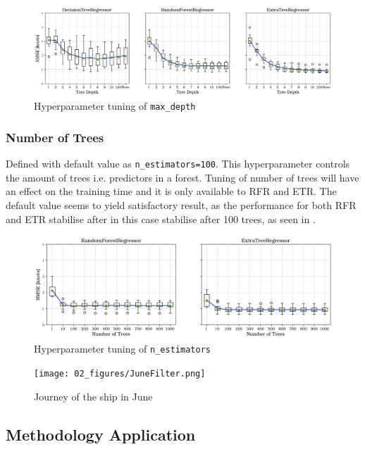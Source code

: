 \begin{figure}[h]
    \centering
        \includegraphics[width=.95\textwidth]{02_figures/hpo_max_depth.png}
        \caption{Hyperparameter tuning of {\tt max\_depth}}
        \label{fig:hpo_max_depth}
\end{figure}

\subsubsection*{Number of Trees}\label{sec:n_estimators}

Defined with default value as {\tt n\_estimators=100}. This hyperparameter controls the amount of trees i.e. predictors in a forest. Tuning of number of trees will have an effect on the training time and it is only available to RFR and ETR. The default value seems to yield satisfactory result, as the performance for both RFR and ETR stabilise after in this case stabilise after 100 trees, as seen in . 

\begin{figure}[h]
    \centering
        \includegraphics[width=.95\textwidth]{02_figures/hpo_n_estimators.png}
        \caption{Hyperparameter tuning of {\tt n\_estimators}}
        \label{fig:n_estimators}
\end{figure}


\begin{figure}
    \centering
        \texttt{[image: 02\_figures/JuneFilter.png]}
        \caption{Journey of the ship in June}
        \label{fig:JuneJourney}
\end{figure}

\subsection{Methodology Application}\label{sec:methodology_application}

